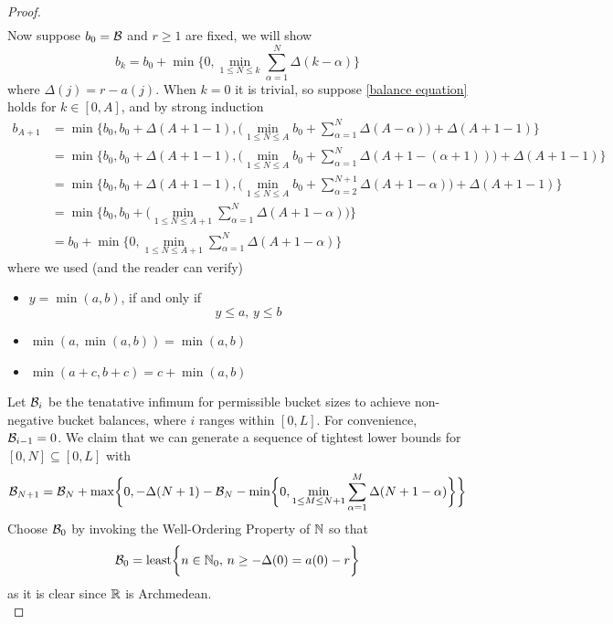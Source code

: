 \documentclass[../../main.tex]{subfiles}
\begin{document}
\begin{proof}
\begin{align*}
    \end{align*}
    Now suppose $b_0=\mathcal{B}$ and $r\geq 1$ are fixed, we will show
    \begin{equation}\label{balance equation}
    b_k=b_0 + \min\biggl\{0,\min_{1\leq N\leq k}\sum^N_{\alpha = 1}\Delta(k-\alpha)\biggr\}
    \end{equation}
    where $\Delta(j)=r-a(j)$. When $k=0$ it is trivial, so suppose \eqref{balance equation} holds for $k\in [0,A]$, and by strong induction
    \begin{align*}
        b_{A+1} &= \min\biggl\{b_0,b_0 + \Delta(A+1 -1),\biggl(\min_{1\leq N\leq A}b_0 + \sum^N_{\alpha = 1}\Delta(A-\alpha)\biggr)+\Delta(A+1-1)\biggr\}\\
        &= \min\biggl\{b_0,b_0 + \Delta(A+1 -1),\biggl(\min_{1\leq N\leq A}b_0 + \sum^N_{\alpha = 1}\Delta(A+1-(\alpha+1))\biggr)+\Delta(A+1-1)\biggr\}\\
        &= \min\biggl\{b_0,b_0 + \Delta(A+1 -1),\biggl(\min_{1\leq N\leq A}b_0 + \sum^{N+1}_{\alpha = 2}\Delta(A+1-\alpha)\biggr)+\Delta(A+1-1)\biggr\}\\
        &= \min\biggl\{b_0,b_0+\biggl(\min_{1\leq N\leq A+1} \sum^{N}_{\alpha = 1}\Delta(A+1-\alpha)\biggr)\biggr\}\\
        &= b_0 + \min\biggl\{0,\min_{1\leq N\leq A+1} \sum^{N}_{\alpha = 1}\Delta(A+1-\alpha)\biggr\}
    \end{align*}
    where we used (and the reader can verify)
    \begin{itemize}
        \item $y=\min(a,b)$, if and only if
        \[y\leq a,\,y\leq b\]
        \item $\min(a,\min(a,b)) = \min(a,b)$
        \item $\min(a+c,b+c) = c+\min(a,b)$
    \end{itemize}
    Let $\mathcal{B}_i$ be the tenatative infimum for permissible bucket sizes to achieve non-negative bucket balances, where $i$ ranges within $[0,L]$. For convenience, $\mathcal{B}_{i-1}=0$. We claim that we can generate a sequence of tightest lower bounds for $[0,N]\subseteq [0,L]$ with 
    \begin{equation}\label{bucket adjustment}
    \mathcal{B}_{N+1}=\mathcal{B}_{N}+\max\biggl\{0,-\Delta(N+1)-\mathcal{B}_{N}-\min\biggl\{0,\min_{1\leq M\leq N+1}\sum^M_{\alpha=1}\Delta(N+1-\alpha)\biggr\}\biggr\}
    \end{equation}
    Choose $\mathcal{B}_0$ by invoking the Well-Ordering Property of $\mathbb{N}$ so that 
    \[\mathcal{B}_0=\operatorname{least}\biggl\{n\in\mathbb{N}_0,\,n\geq-\Delta(0)=a(0)-r\biggr\}\]
    as it is clear since $\mathbb{R}$ is Archmedean.\\
    

\end{proof}
\end{document}
